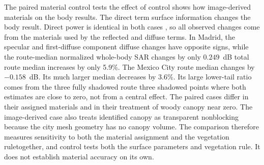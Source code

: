 \documentclass{IEEEoj} %
\providecommand{\DIFadd}[1]{{\protect\color{blue} \sf #1}} %
\providecommand{\DIFdel}[1]{{\protect\color{red} \scriptsize #1}} %
\providecommand{\DIFaddbegin}{} %
\providecommand{\DIFaddend}{} %
\providecommand{\DIFdelbegin}{} %
\providecommand{\DIFdelend}{} %
\begin{document}
The paired \DIFdelbegin \DIFdel{material control tests the effect of }\DIFdelend \DIFaddbegin \DIFadd{control shows how }\DIFaddend image-derived \DIFdelbegin \DIFdel{materials on the body
results. The direct term }\DIFdelend \DIFaddbegin \DIFadd{surface information changes the body
result. Direct power }\DIFaddend is identical in both cases\DIFdelbegin \DIFdel{, so all observed
changes come from the materials used by the reflected and diffuse terms}\DIFdelend . In Madrid, the specular and
\DIFdelbegin \DIFdel{first-diffuse component }\DIFdelend \DIFaddbegin \DIFadd{diffuse }\DIFaddend changes have opposite signs, while the \DIFdelbegin \DIFdel{route-median normalized whole-body SAR changes by
only $0.249$~dB}\DIFdelend \DIFaddbegin \DIFadd{total route median increases by
only 5.9\%}\DIFaddend . The Mexico City \DIFdelbegin \DIFdel{route median changes by $-0.158$~dB. Its much larger }\DIFdelend \DIFaddbegin \DIFadd{median decreases by 3.6\%. Its large }\DIFaddend lower-tail
ratio comes from \DIFdelbegin \DIFdel{the three fully shadowed route }\DIFdelend \DIFaddbegin \DIFadd{three shadowed }\DIFaddend points where both estimates are \DIFdelbegin \DIFdel{close to zero, not from a central effect. The paired cases differ in their
assigned materials and in their treatment of woody canopy}\DIFdelend \DIFaddbegin \DIFadd{near zero}\DIFaddend . The
image-derived case \DIFaddbegin \DIFadd{also }\DIFaddend treats identified canopy as
\DIFdelbegin \DIFdel{transparent }\DIFdelend \DIFaddbegin \DIFadd{nonblocking }\DIFaddend because the city \DIFdelbegin \DIFdel{mesh }\DIFdelend \DIFaddbegin \DIFadd{geometry }\DIFaddend has no canopy volume. The \DIFdelbegin \DIFdel{comparison therefore measures sensitivity to both the material
assignment and the vegetation ruletogether, and }\DIFdelend \DIFaddbegin \DIFadd{control tests
both the surface parameters and vegetation rule. It }\DIFaddend does not establish material
accuracy\DIFdelbegin \DIFdel{on its own}\DIFdelend .
\end{document}
